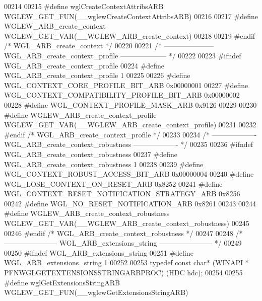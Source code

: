 \begin{DoxyCode}
00214 
00215 \textcolor{preprocessor}{#define wglCreateContextAttribsARB WGLEW\_GET\_FUN(\_\_wglewCreateContextAttribsARB)}
00216 
00217 \textcolor{preprocessor}{#define WGLEW\_ARB\_create\_context WGLEW\_GET\_VAR(\_\_WGLEW\_ARB\_create\_context)}
00218 
00219 \textcolor{preprocessor}{#endif }\textcolor{comment}{/* WGL\_ARB\_create\_context */}\textcolor{preprocessor}{}
00220 
00221 \textcolor{comment}{/* --------------------- WGL\_ARB\_create\_context\_profile -------------------- */}
00222 
00223 \textcolor{preprocessor}{#ifndef WGL\_ARB\_create\_context\_profile}
00224 \textcolor{preprocessor}{#define WGL\_ARB\_create\_context\_profile 1}
00225 
00226 \textcolor{preprocessor}{#define WGL\_CONTEXT\_CORE\_PROFILE\_BIT\_ARB 0x00000001}
00227 \textcolor{preprocessor}{#define WGL\_CONTEXT\_COMPATIBILITY\_PROFILE\_BIT\_ARB 0x00000002}
00228 \textcolor{preprocessor}{#define WGL\_CONTEXT\_PROFILE\_MASK\_ARB 0x9126}
00229 
00230 \textcolor{preprocessor}{#define WGLEW\_ARB\_create\_context\_profile WGLEW\_GET\_VAR(\_\_WGLEW\_ARB\_create\_context\_profile)}
00231 
00232 \textcolor{preprocessor}{#endif }\textcolor{comment}{/* WGL\_ARB\_create\_context\_profile */}\textcolor{preprocessor}{}
00233 
00234 \textcolor{comment}{/* ------------------- WGL\_ARB\_create\_context\_robustness ------------------- */}
00235 
00236 \textcolor{preprocessor}{#ifndef WGL\_ARB\_create\_context\_robustness}
00237 \textcolor{preprocessor}{#define WGL\_ARB\_create\_context\_robustness 1}
00238 
00239 \textcolor{preprocessor}{#define WGL\_CONTEXT\_ROBUST\_ACCESS\_BIT\_ARB 0x00000004}
00240 \textcolor{preprocessor}{#define WGL\_LOSE\_CONTEXT\_ON\_RESET\_ARB 0x8252}
00241 \textcolor{preprocessor}{#define WGL\_CONTEXT\_RESET\_NOTIFICATION\_STRATEGY\_ARB 0x8256}
00242 \textcolor{preprocessor}{#define WGL\_NO\_RESET\_NOTIFICATION\_ARB 0x8261}
00243 
00244 \textcolor{preprocessor}{#define WGLEW\_ARB\_create\_context\_robustness WGLEW\_GET\_VAR(\_\_WGLEW\_ARB\_create\_context\_robustness)}
00245 
00246 \textcolor{preprocessor}{#endif }\textcolor{comment}{/* WGL\_ARB\_create\_context\_robustness */}\textcolor{preprocessor}{}
00247 
00248 \textcolor{comment}{/* ----------------------- WGL\_ARB\_extensions\_string ----------------------- */}
00249 
00250 \textcolor{preprocessor}{#ifndef WGL\_ARB\_extensions\_string}
00251 \textcolor{preprocessor}{#define WGL\_ARB\_extensions\_string 1}
00252 
00253 \textcolor{keyword}{typedef} \textcolor{keyword}{const} \textcolor{keywordtype}{char}* (WINAPI * PFNWGLGETEXTENSIONSSTRINGARBPROC) (HDC hdc);
00254 
00255 \textcolor{preprocessor}{#define wglGetExtensionsStringARB WGLEW\_GET\_FUN(\_\_wglewGetExtensionsStringARB)}

\end{DoxyCode}
